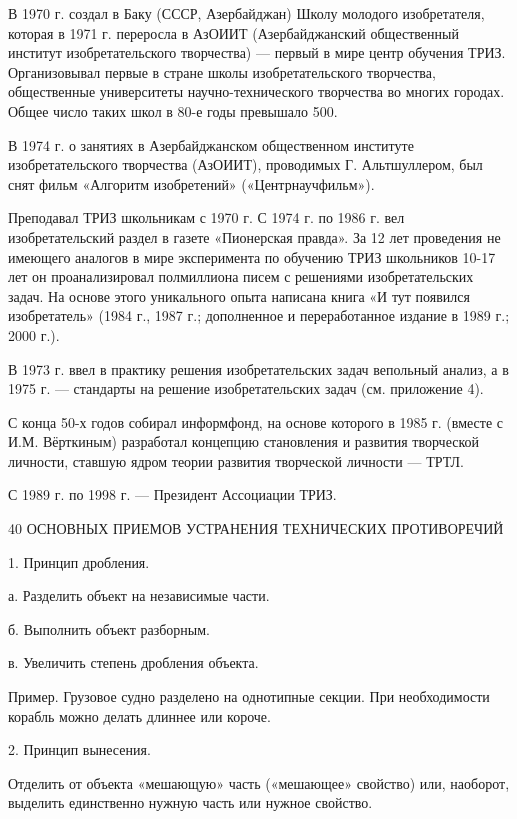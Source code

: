 В  1970   г.  создал  в   Баку  (СССР,  Азербайджан)   Школу  молодого
изобретателя, которая  в 1971  г. переросла в  АзОИИТ (Азербайджанский
общественный   институт   изобретательского   творчества)   —   первый
в   мире  центр   обучения   ТРИЗ.  Организовывал   первые  в   стране
школы   изобретательского    творчества,   общественные   университеты
научно-технического творчества  во многих  городах. Общее  число таких
школ в 80-е годы превышало 500.

В  1974  г.  о   занятиях  в  Азербайджанском  общественном  институте
изобретательского творчества (АзОИИТ), проводимых Г. Альтшуллером, был
снят фильм «Алгоритм изобретений» («Центрнаучфильм»).

Преподавал  ТРИЗ  школьникам с  1970  г.  С 1974  г.  по  1986 г.  вел
изобретательский  раздел  в  газете  «Пионерская правда».  За  12  лет
проведения не имеющего  аналогов в мире эксперимента  по обучению ТРИЗ
школьников 10-17 лет он  проанализировал полмиллиона писем с решениями
изобретательских  задач. На  основе этого  уникального опыта  написана
книга «И тут  появился изобретатель» (1984 г., 1987  г.; дополненное и
переработанное издание в 1989 г.; 2000 г.).

В 1973  г. ввел  в практику  решения изобретательских  задач вепольный
анализ, а в 1975 г. — стандарты на решение изобретательских задач (см.
приложение 4).

С конца  50-х годов собирал информфонд,  на основе которого в  1985 г.
(вместе с И.М. Вёрткиным)  разработал концепцию становления и развития
творческой личности, ставшую ядром теории развития творческой личности
— ТРТЛ.

С 1989 г. по 1998 г. — Президент Ассоциации ТРИЗ.



40 ОСНОВНЫХ ПРИЕМОВ УСТРАНЕНИЯ ТЕХНИЧЕСКИХ ПРОТИВОРЕЧИЙ


1. Принцип дробления.

а. Разделить объект на независимые части.

б. Выполнить объект разборным.

в. Увеличить степень дробления объекта.

Пример.   Грузовое  судно   разделено   на   однотипные  секции.   При
необходимости корабль можно делать длиннее или короче.

2. Принцип вынесения.

Отделить  от  объекта  «мешающую»  часть  («мешающее»  свойство)  или,
наоборот, выделить единственно нужную часть или нужное свойство.

